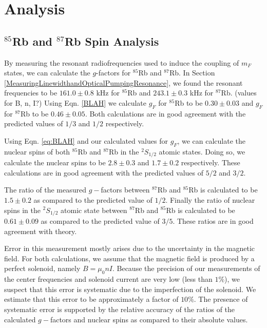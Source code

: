 
\section{Analysis}\label{analysis}

\subsection{$^{85}$Rb and $^{87}$Rb Spin Analysis}\label{SpinAnalysis}

By measuring the resonant radiofrequencies used to induce the coupling of $m_F$ states, we can calculate the $g$-factors for $^{85}$Rb and $^{87}$Rb.  In Section \ref{MeasuringLinewidthandOpticalPumpingResonance}, we found the resonant frequencies to be $161.0 \pm 0.8$ kHz for $^{85}$Rb and $243.1\pm 0.3$ kHz for $^{87}$Rb.  (values for B, n, I?) Using Eqn. \ref{BLAH} we calculate $g_F$ for $^{85}$Rb to be $0.30\pm 0.03$ and $g_F$ for $^{87}$Rb to be $0.46\pm 0.05$.  Both calculations are in good agreement with the predicted values of $1/3$ and $1/2$ respectively. 

Using Eqn. \ref{eq:BLAH} and our calculated values for $g_F$, we can calculate the nuclear spins of both $^{85}$Rb and $^{87}$Rb in the $^{2}S_{1/2}$ atomic states.  Doing so, we calculate the nuclear spins to be $2.8 \pm 0.3$ and $1.7 \pm 0.2$ respectively.  These calculations are in good agreement with the predicted values of $5/2$ and $3/2$.  

The ratio of the measured $g-$factors between $^{87}$Rb and $^{85}$Rb is calculated to be $1.5 \pm 0.2$ as compared to the predicted value of $1/2$.  Finally the ratio of nuclear spins in the $^{2}S_{1/2}$ atomic state between $^{87}$Rb and $^{85}$Rb is calculated to be $0.61\pm 0.09$ as compared to the predicted value of $3/5$.  These ratios are in good agreement with theory.

Error in this measurement mostly arises due to the uncertainty in the magnetic field.  For both calculations, we assume that the magnetic field is produced by a perfect solenoid, namely $B=\mu_0 n I$.  Because the precision of our measurements of the center frequencies and solenoid current are very low (less than $1\%$), we suspect that this error is systematic due to the imperfection of the solenoid.  We estimate that this error to be approximately a factor of $10\%$. The presence of systematic error is supported by the relative accuracy of the ratios of the calculated $g-$factors and nuclear spins as compared to their absolute values.  

